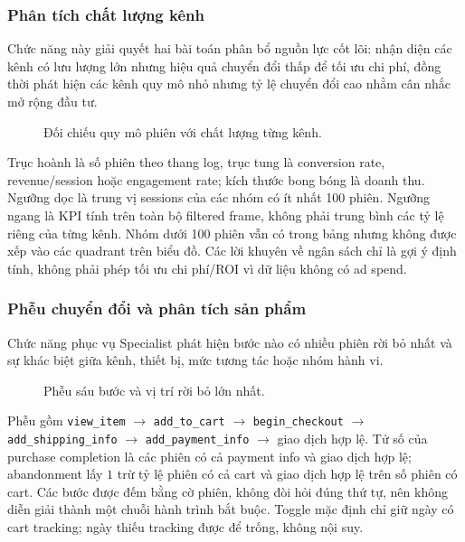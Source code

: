 \subsubsection{Phân tích chất lượng kênh}

Chức năng này giải quyết hai bài toán phân bổ nguồn lực cốt lõi: nhận diện các kênh có lưu lượng lớn nhưng hiệu quả chuyển đổi thấp để tối ưu chi phí, đồng thời phát hiện các kênh quy mô nhỏ nhưng tỷ lệ chuyển đổi cao nhằm cân nhắc mở rộng đầu tư.

\begin{figure}[H]
  \centering
  \caption{Đối chiếu quy mô phiên với chất lượng từng kênh.}
  \label{fig:ui-channel-quality}
\end{figure}

Trục hoành là số phiên theo thang log, trục tung là conversion rate, revenue/session hoặc engagement rate; kích thước bong bóng là doanh thu. Ngưỡng dọc là trung vị sessions của các nhóm có ít nhất 100 phiên. Ngưỡng ngang là KPI tính trên toàn bộ filtered frame, không phải trung bình các tỷ lệ riêng của từng kênh. Nhóm dưới 100 phiên vẫn có trong bảng nhưng không được xếp vào các quadrant trên biểu đồ. Các lời khuyên về ngân sách chỉ là gợi ý định tính, không phải phép tối ưu chi phí/ROI vì dữ liệu không có ad spend.

\subsubsection{Phễu chuyển đổi và phân tích sản phẩm}

Chức năng phục vụ Specialist phát hiện bước nào có nhiều phiên rời bỏ nhất và sự khác biệt giữa kênh, thiết bị, mức tương tác hoặc nhóm hành vi.

\begin{figure}[H]
  \centering
  \caption{Phễu sáu bước và vị trí rời bỏ lớn nhất.}
  \label{fig:ui-funnel}
\end{figure}

Phễu gồm \texttt{view\_item} $\rightarrow$ \texttt{add\_to\_cart} $\rightarrow$ \texttt{begin\_checkout} $\rightarrow$ \texttt{add\_shipping\_info} $\rightarrow$ \texttt{add\_payment\_info} $\rightarrow$ giao dịch hợp lệ. Tử số của purchase completion là các phiên có cả payment info và giao dịch hợp lệ; abandonment lấy $1$ trừ tỷ lệ phiên có cả cart và giao dịch hợp lệ trên số phiên có cart. Các bước được đếm bằng cờ phiên, không đòi hỏi đúng thứ tự, nên không diễn giải thành một chuỗi hành trình bắt buộc. Toggle mặc định chỉ giữ ngày có cart tracking; ngày thiếu tracking được để trống, không nội suy. \medskip

